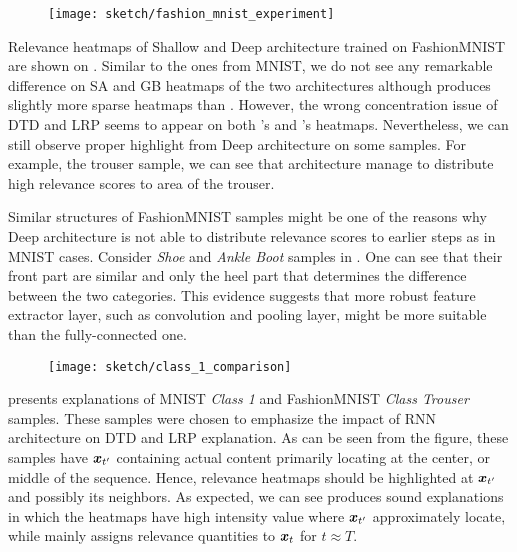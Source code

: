  \begin{figure}[!htb]
\centering
\texttt{[image: sketch/fashion\_mnist\_experiment]}
\label{fig:fashion_mnist_experiment}
\end{figure}

Relevance heatmaps of Shallow and Deep architecture trained on  FashionMNIST  are shown on \addfigure{\ref{fig:fashion_mnist_experiment}}. Similar to the ones from MNIST, we do not see any remarkable difference on SA and GB heatmaps of the two architectures although  produces slightly more sparse heatmaps than . However, the wrong concentration issue of DTD and LRP seems to appear on both 's and 's heatmaps. Nevertheless, we can still observe proper highlight from Deep architecture on some samples. For example, the trouser sample, we can see  that  architecture manage to distribute high relevance scores to area of the trouser. 

Similar structures of FashionMNIST samples might be one of the reasons why Deep architecture is not able to distribute relevance scores to earlier steps as in MNIST cases. Consider \textit{Shoe} and \textit{Ankle Boot} samples in \addfigure{\ref{fig:fashion_mnist_samples}}. One can see that  their front part are similar and only the heel part that determines the difference between the two categories. This evidence suggests that  more robust feature extractor layer, such as convolution and pooling layer, might be more suitable than the fully-connected one.


 \begin{figure}[!htb]
\centering
\texttt{[image: sketch/class\_1\_comparison]}
\label{fig:class_1_comparison}
\end{figure}

\addfigure{\ref{fig:class_1_comparison}} presents explanations of MNIST \textit{Class 1} and FashionMNIST \textit{Class Trouser} samples. These samples were chosen to emphasize the impact of RNN architecture on DTD and LRP explanation. As can be seen from the figure, these samples have $\boldsymbol{x}_{t'}$ containing actual content  primarily locating at the center, or middle of the sequence. Hence, relevance heatmaps should be highlighted at $\boldsymbol{x}_{t'}$ and possibly its neighbors.  As expected, we can see  produces sound explanations in which the heatmaps have high intensity value where $\boldsymbol{x}_{t'}$ approximately locate, while  mainly assigns relevance quantities to $\boldsymbol{x}_{t}$ for $t \approx T$. 

